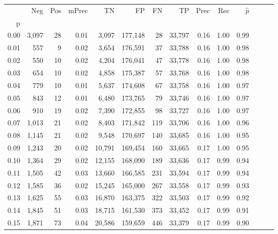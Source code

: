 \begin{tabular}{rrrrrrrrrrrrrr}
\toprule
{} &    Neg &  Pos & mPrec &       TN &       FP &      FN &      TP &  Prec &   Rec & $\hat{p}$ \\
p    &        &      &       &          &          &         &         &       &       &           \\
\midrule
0.00 &  3,097 &   28 &  0.01 &    3,097 &  177,148 &      28 &  33,797 &  0.16 &  1.00 &      0.99 \\
0.01 &    557 &    9 &  0.02 &    3,654 &  176,591 &      37 &  33,788 &  0.16 &  1.00 &      0.98 \\
0.02 &    550 &   10 &  0.02 &    4,204 &  176,041 &      47 &  33,778 &  0.16 &  1.00 &      0.98 \\
0.03 &    654 &   10 &  0.02 &    4,858 &  175,387 &      57 &  33,768 &  0.16 &  1.00 &      0.98 \\
0.04 &    779 &   10 &  0.01 &    5,637 &  174,608 &      67 &  33,758 &  0.16 &  1.00 &      0.97 \\
0.05 &    843 &   12 &  0.01 &    6,480 &  173,765 &      79 &  33,746 &  0.16 &  1.00 &      0.97 \\
0.06 &    910 &   19 &  0.02 &    7,390 &  172,855 &      98 &  33,727 &  0.16 &  1.00 &      0.97 \\
0.07 &  1,013 &   21 &  0.02 &    8,403 &  171,842 &     119 &  33,706 &  0.16 &  1.00 &      0.96 \\
0.08 &  1,145 &   21 &  0.02 &    9,548 &  170,697 &     140 &  33,685 &  0.16 &  1.00 &      0.95 \\
0.09 &  1,243 &   20 &  0.02 &   10,791 &  169,454 &     160 &  33,665 &  0.17 &  1.00 &      0.95 \\
0.10 &  1,364 &   29 &  0.02 &   12,155 &  168,090 &     189 &  33,636 &  0.17 &  0.99 &      0.94 \\
0.11 &  1,505 &   42 &  0.03 &   13,660 &  166,585 &     231 &  33,594 &  0.17 &  0.99 &      0.94 \\
0.12 &  1,585 &   36 &  0.02 &   15,245 &  165,000 &     267 &  33,558 &  0.17 &  0.99 &      0.93 \\
0.13 &  1,625 &   55 &  0.03 &   16,870 &  163,375 &     322 &  33,503 &  0.17 &  0.99 &      0.92 \\
0.14 &  1,845 &   51 &  0.03 &   18,715 &  161,530 &     373 &  33,452 &  0.17 &  0.99 &      0.91 \\
0.15 &  1,871 &   73 &  0.04 &   20,586 &  159,659 &     446 &  33,379 &  0.17 &  0.99 &      0.90 \\

\end{tabular}
